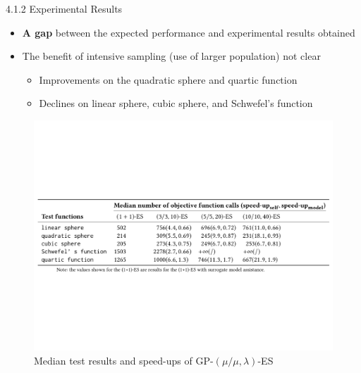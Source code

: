 \documentclass{beamer}
\begin{document}
\begin{frame}{4.1.2 Experimental Results}

\begin{itemize}
    \item \textbf{A gap} between the expected performance and experimental results obtained 
    \item The benefit of intensive sampling (use of larger population) not clear
        \begin{itemize}
            \item Improvements on the quadratic sphere and quartic function
            \item Declines on linear sphere, cubic sphere, and Schwefel's function
        \end{itemize}
\end{itemize}

\begin{figure}
\includegraphics[width=1.0\linewidth]{tab-GP-mml-ES.pdf}
    \caption{Median test results and speed-ups of GP-$(\mu/\mu,\lambda)$-ES}
\end{figure}


\end{frame}
\end{document}
